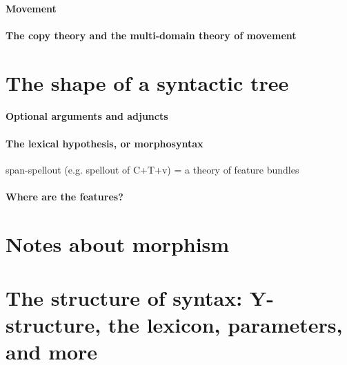 \documentclass[a4paper]{article}
\begin{document}
\paragraph{Movement} 

\paragraph{The copy theory and the multi-domain theory of movement}

\section{The shape of a syntactic tree}

\paragraph{Optional arguments and adjuncts} 

\paragraph{The lexical hypothesis, or morphosyntax} span-spellout (e.g. spellout of C+T+v) = a theory of feature bundles

\paragraph{Where are the features?} 

\section{Notes about morphism}

\section{The structure of syntax: Y-structure, the lexicon, parameters, and more}
\end{document}
